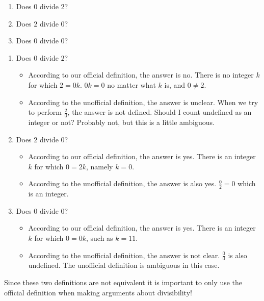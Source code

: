 \begin{xca}
	\begin{enumerate}
	\item Does $0$ divide $2$?  
	\item Does $2$ divide $0$?  
	\item Does $0$ divide $0$?
	\end{enumerate}
\end{xca}

\begin{solutions}
	\begin{enumerate}
		\item Does $0$ divide $2$?
		
		\begin{itemize}
			\item According to our official definition, the answer is no.  There is no integer $k$ for which $2 = 0k$.  $0k = 0$ no matter what $k$ is, and $0 \neq 2$.
			\item According to the unofficial definition, the answer is unclear.  When we try to perform $\frac{2}{0}$, the answer is not defined.  Should I count undefined as an integer or not?  Probably not, but this is a little ambiguous.
			\end{itemize}
		\item Does $2$ divide $0$? 
		
		\begin{itemize}
			\item According to our official definition, the answer is yes.  There is an integer $k$ for which $0 = 2k$, namely $k=0$.
			\item According to the unofficial definition, the answer is also yes.  $\frac{0}{2} = 0$ which is an integer.
			\end{itemize}
		\item Does $0$ divide $0$? 
				\begin{itemize}
			\item According to our official definition, the answer is yes.  There is an integer $k$ for which $0 = 0k$, such as $k=11$.
			\item According to the unofficial definition, the answer is not clear.  $\frac{0}{0}$ is also undefined.  The unofficial definition is ambiguous in this case.
		\end{itemize}
	\end{enumerate}
\end{solutions}

Since these two definitions are not equivalent it is important to only use the official definition when making arguments about divisibility!

